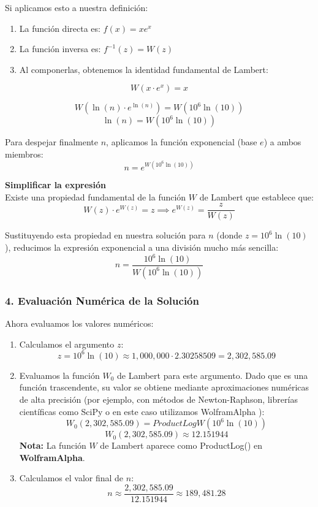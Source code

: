 \begin{enumerate}
\begin{tcolorbox}
    Si aplicamos esto a nuestra definición:
    \begin{enumerate}[leftmargin=*]
        \item La función directa es: \textbf{$f(x) = x e^x$}
        \item La función inversa es: \textbf{$f^{-1}(z) = W(z)$}
        \item Al componerlas, obtenemos la identidad fundamental de Lambert: 
    \end{enumerate}
    $$W(x \cdot e^x) = x$$
    \end{tcolorbox}

    $$W(\ln(n) \cdot e^{\ln(n)}) = W(10^6 \ln(10))$$
    $$\ln(n) = W(10^6 \ln(10))$$
    
    Para despejar finalmente $n$, aplicamos la función exponencial (base $e$) a ambos miembros:
    $$n = e^{W(10^6 \ln(10))}$$
    
    \textbf{Simplificar la expresión}\\
    Existe una propiedad fundamental de la función $W$ de Lambert que establece que:
    $$W(z) \cdot e^{W(z)} = z \implies e^{W(z)} = \frac{z}{W(z)}$$
    
    Sustituyendo esta propiedad en nuestra solución para $n$ (donde $z = 10^6 \ln(10)$), reducimos la expresión exponencial a una división mucho más sencilla:
    $$n = \frac{10^6 \ln(10)}{W(10^6 \ln(10))}$$
    
    \subsubsection*{4. Evaluación Numérica de la Solución}
    Ahora evaluamos los valores numéricos:
    \begin{enumerate}[leftmargin=*]
        \item Calculamos el argumento $z$:
        $$z = 10^6 \ln(10) \approx 1,000,000 \cdot 2.30258509 = 2,302,585.09$$
        \item Evaluamos la función $W_0$ de Lambert para este argumento. Dado que es una función trascendente, su valor se obtiene mediante aproximaciones numéricas de alta precisión (por ejemplo, con métodos de Newton-Raphson, librerías científicas como SciPy o en este caso utilizamos WolframAlpha \cite{pensando2021lambert}):
        $$W_0(2,302,585.09) = ProductLogW(10^6 \ln(10)) $$
        $$W_0(2,302,585.09) \approx 12.151944$$
        \textbf{Nota:} La función $W$ de Lambert aparece como ProductLog() en \textbf{WolframAlpha}.
        \item Calculamos el valor final de $n$:
        $$n \approx \frac{2,302,585.09}{12.151944} \approx 189,481.28$$
    \end{enumerate}


\end{enumerate}
